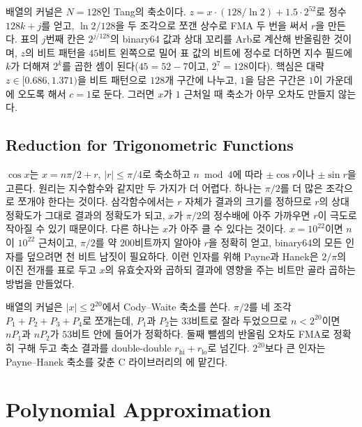 \begin{instardust}
배열의  커널은 $N=128$인 Tang의 축소이다. $z=x\cdot(128/\ln2)+1.5\cdot2^{52}$로 정수 $128k+j$를 얻고, $\ln2/128$을 두 조각으로 쪼갠 상수로 FMA 두 번을 써서 $r$을 만든다. 표의 $j$번째 칸은 $2^{j/128}$의 binary64 값과 상대 꼬리를 Arb로 계산해 반올림한 것이며, $z$의 비트 패턴을 $45$비트 왼쪽으로 밀어 표 값의 비트에 정수로 더하면 지수 필드에 $k$가 더해져 $2^k$를 곱한 셈이 된다($45=52-7$이고, $2^7=128$이다).  핵심은 대략 $z\in[0.686,1.371)$을 비트 패턴으로 $128$개 구간에 나누고, $1$을 담은 구간은 $1$이 가운데에 오도록 해서 $c=1$로 둔다. 그러면 $x$가 $1$ 근처일 때 축소가 아무 오차도 만들지 않는다.
\end{instardust}

\subsection{Reduction for Trigonometric Functions}

$\cos x$는 $x=n\pi/2+r$, $|r|\le\pi/4$로 축소하고 $n\bmod4$에 따라 $\pm\cos r$이나 $\pm\sin r$을 고른다. 원리는 지수함수와 같지만 두 가지가 더 어렵다. 하나는 $\pi/2$를 더 많은 조각으로 쪼개야 한다는 것이다. 삼각함수에서는 $r$ 자체가 결과의 크기를 정하므로 $r$의 상대 정확도가 그대로 결과의 정확도가 되고, $x$가 $\pi/2$의 정수배에 아주 가까우면 $r$이 극도로 작아질 수 있기 때문이다. 다른 하나는 $x$가 아주 클 수 있다는 것이다. $x=10^{22}$이면 $n$이 $10^{22}$ 근처이고, $\pi/2$를 약 $200$비트까지 알아야 $r$을 정확히 얻고, binary64의 모든 인자를 덮으려면 천 비트 남짓이 필요하다. 이런 인자를 위해 Payne과 Hanek은 $2/\pi$의 이진 전개를 표로 두고 $x$의 유효숫자와 곱하되 결과에 영향을 주는 비트만 골라 곱하는 방법을 만들었다\cite{payne1983}.

\begin{instardust}
배열의  커널은 $|x|\le2^{20}$에서 Cody--Waite 축소를 쓴다. $\pi/2$를 네 조각 $P_1+P_2+P_3+P_4$로 쪼개는데, $P_1$과 $P_2$는 $33$비트로 잘라 두었으므로 $n<2^{20}$이면 $nP_1$과 $nP_2$가 $53$비트 안에 들어가 정확하다. 둘째 뺄셈의 반올림 오차도 FMA로 정확히 구해 두고 축소 결과를 double-double $r_{\mathrm{hi}}+r_{\mathrm{lo}}$로 넘긴다. $2^{20}$보다 큰 인자는 Payne--Hanek 축소를 갖춘 C 라이브러리의 에 맡긴다.
\end{instardust}

\section{Polynomial Approximation}
\label{sec:poly-approx}

